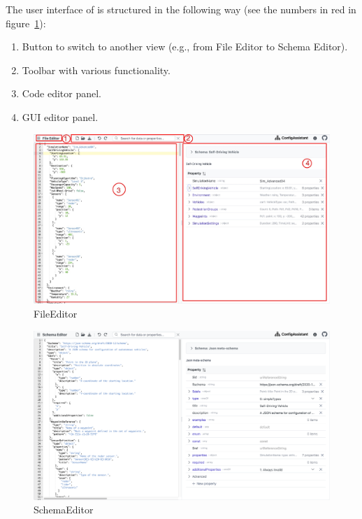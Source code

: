 The user interface of \toolname{} is structured in the following way (see the numbers in red in figure~\ref{fig:fileeditor}):
\begin{enumerate}
    \item Button to switch to another view (e.g., from File Editor to Schema Editor).
    \item Toolbar with various functionality.
    \item Code editor panel.
    \item GUI editor panel.
\end{enumerate}

\begin{figure}
    \includegraphics[width=\textwidth]{figures/fileeditor}
    \caption{FileEditor}
    \label{fig:fileeditor}
\end{figure}

\begin{figure}
    \includegraphics[width=\textwidth]{figures/schemaeditor}
    \caption{SchemaEditor}
    \label{fig:schemaeditor}
\end{figure}


